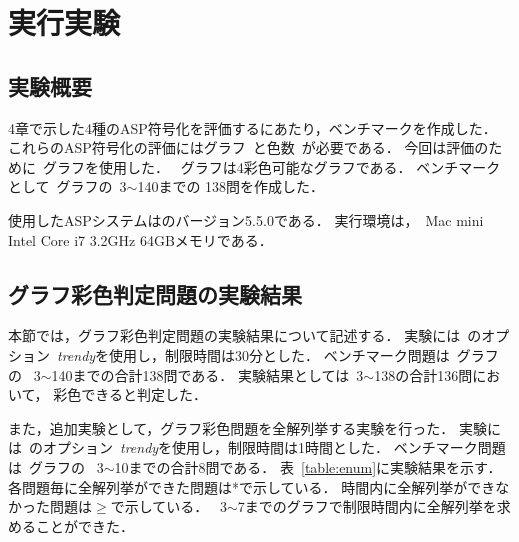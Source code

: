 \chapter{実行実験}

\section{実験概要}

4章で示した4種のASP符号化を評価するにあたり，ベンチマークを作成した．
これらのASP符号化の評価にはグラフ~と色数~が必要である．
今回は評価のために~グラフを使用した．
~グラフは4彩色可能なグラフである．
ベンチマークとして~グラフの~3$\sim$140までの
138問を作成した．

使用したASPシステムは{\clingo}のバージョン5.5.0である．
実行環境は，~Mac mini Intel Core i7 3.2GHz 64GBメモリである．

\section{グラフ彩色判定問題の実験結果}

本節では，グラフ彩色判定問題の実験結果について記述する．
実験には~{\clingo}のオプション~\textit{trendy}を使用し，制限時間は30分とした．
ベンチマーク問題は~グラフの
~3$\sim$140までの合計138問である．
実験結果としては~3$\sim$138の合計136問において，
彩色できると判定した．

また，追加実験として，グラフ彩色問題を全解列挙する実験を行った．
実験には~{\clingo}のオプション~\textit{trendy}を使用し，制限時間は1時間とした．
ベンチマーク問題は~グラフの
~3$\sim$10までの合計8問である．
表~\ref{table:enum}に実験結果を示す．
各問題毎に全解列挙ができた問題は*で示している．
時間内に全解列挙ができなかった問題は$\geq$で示している．
~3$\sim$7までのグラフで制限時間内に全解列挙を求めることができた．

\begin{table}[tb]
  \begin{minipage}[t]{0.45\linewidth}
    \centering
  \end{minipage}
  \begin{minipage}[t]{0.45\linewidth}
    \centering
  \end{minipage}
\end{table}

